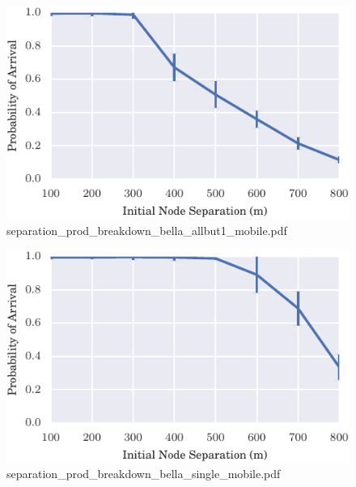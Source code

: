 \documentclass{article}
\begin{document}
\begin{figure}[h!]
\centering
\includegraphics[width=\linewidth]{separation_prod_breakdown_bella_allbut1_mobile.pdf}
\caption{separation\_prod\_breakdown\_bella\_allbut1\_mobile.pdf}
\end{figure}




\begin{figure}[h!]
\centering
\includegraphics[width=\linewidth]{separation_prod_breakdown_bella_single_mobile.pdf}
\caption{separation\_prod\_breakdown\_bella\_single\_mobile.pdf}
\end{figure}
\end{document}
